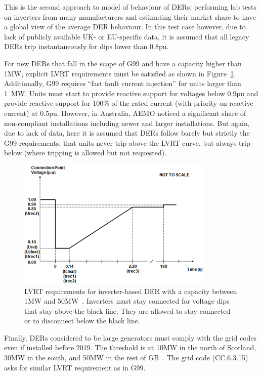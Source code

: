 This is the second approach to model of behaviour of DERs: performing lab tests on inverters from many manufacturers and estimating their market share to have a global view of the average DER behaviour. In this test case however, due to lack of publicly available UK- or EU-specific data, it is assumed that all legacy DERs trip instantaneously for dips lower than 0.8pu.

For new DERs that fall in the scope of G99 and have a capacity higher than 1MW, explicit LVRT requirements must be satisfied as shown in Figure~\ref{fig:G99_LVRT}. Additionally, G99 requires ``fast fault current injection'' for units larger than 1~MW. Units must start to provide reactive support for voltages below 0.9pu and provide reactive support for 100\% of the rated current (with priority on reactive current) at 0.5pu. However, in Australia, AEMO noticed a significant share of non-compliant installations including newer and larger installations. But again, due to lack of data, here it is assumed that DERs follow barely but strictly the G99 requirements, \ie that units never trip above the LVRT curve, but always trip below (where tripping is allowed but not requested).

\begin{figure}
    \centering
    \includegraphics[width=0.7\linewidth]{Figs/G99_LVRT.png}
    \caption{LVRT requirements for inverter-based DER with a capacity between 1MW and 50MW~\cite{G99}. Inverters must stay connected for voltage dips that stay above the black line. They are allowed to stay connected or to disconnect below the black line.}
    \label{fig:G99_LVRT}
\end{figure}

Finally, DERs considered to be large generators must comply with the grid codes even if installed before 2019. The threshold is at 10MW in the north of Scotland, 30MW in the south, and 50MW in the rest of GB~\cite{GBConnectionConditions}. The grid code (CC.6.3.15) asks for similar LVRT requirement as in G99.

